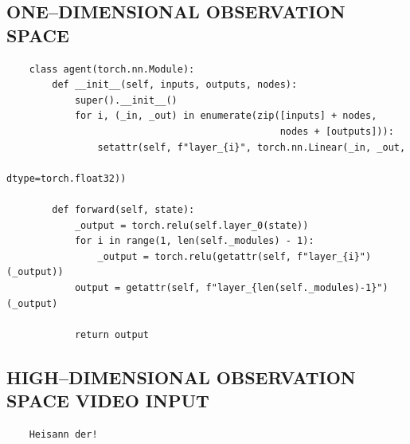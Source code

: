 \documentclass{article}
\renewenvironment{leftbar}[1][\hsize]{
    \def\FrameCommand{{\color{barcolor}\vrule width 0.5pt \hspace{10pt}}}
    \MakeFramed{\hsize#1 \advance\hsize-\width \FrameRestore}
}{\endMakeFramed}
\begin{document}
\subsection*{\normalsize ONE–DIMENSIONAL OBSERVATION SPACE}
\begin{leftbar}
    \begin{lstlisting}
    class agent(torch.nn.Module):
        def __init__(self, inputs, outputs, nodes):
            super().__init__()
            for i, (_in, _out) in enumerate(zip([inputs] + nodes,
                                                nodes + [outputs])):
                setattr(self, f"layer_{i}", torch.nn.Linear(_in, _out,
                                                            dtype=torch.float32))

        def forward(self, state):
            _output = torch.relu(self.layer_0(state))
            for i in range(1, len(self._modules) - 1):
                _output = torch.relu(getattr(self, f"layer_{i}")(_output))
            output = getattr(self, f"layer_{len(self._modules)-1}")(_output)

            return output
    \end{lstlisting}
\end{leftbar}
\subsection*{\normalsize HIGH–DIMENSIONAL OBSERVATION SPACE \hfill VIDEO INPUT}
\begin{leftbar}
    \begin{lstlisting}
    Heisann der!
    \end{lstlisting}
\end{leftbar}
\end{document}

